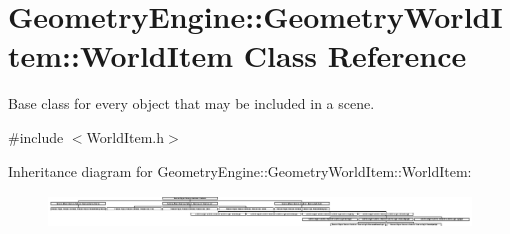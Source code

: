 \hypertarget{class_geometry_engine_1_1_geometry_world_item_1_1_world_item}{}\section{Geometry\+Engine\+::Geometry\+World\+Item\+::World\+Item Class Reference}
\label{class_geometry_engine_1_1_geometry_world_item_1_1_world_item}


Base class for every object that may be included in a scene.  




{\ttfamily \#include $<$World\+Item.\+h$>$}

Inheritance diagram for Geometry\+Engine\+::Geometry\+World\+Item\+::World\+Item\+:\begin{figure}[H]
\begin{center}
\leavevmode
\includegraphics[height=0.876827cm]{class_geometry_engine_1_1_geometry_world_item_1_1_world_item}
\end{center}
\end{figure}
